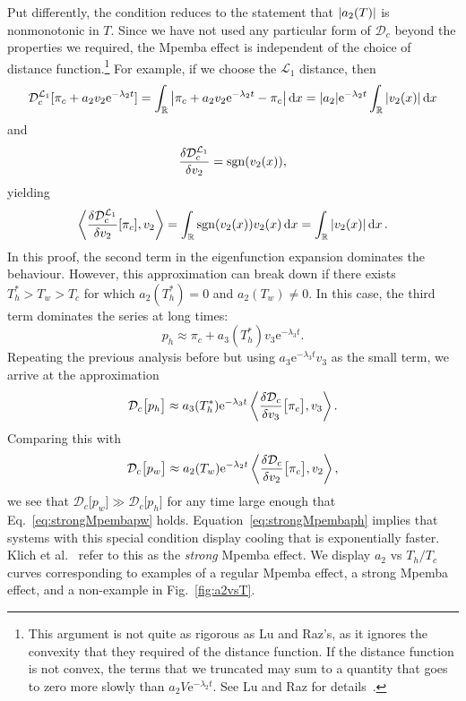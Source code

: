 \documentclass[hyperref={colorlinks=true, urlcolor=blue, citecolor=blue, final, bound}]{sfuthesis}
\newcommand{\sgn}{\mathrm{sgn}}
\newcommand{\e}{\mathrm{e}}
\begin{document}
Put differently, the condition reduces to the statement that $\abs{a_2(T)}$ is nonmonotonic in $T$.  Since we have not used any particular form of $\mathcal D_c$ beyond the properties we required, the Mpemba effect is independent of the choice of distance function.\footnote{This argument is not quite as rigorous as Lu and Raz's, as it ignores the convexity that they required of the distance function. If the distance function is not convex, the terms that we truncated may sum to a quantity that goes to zero more slowly than $a_2V\e^{-\lambda_2t}$. See Lu and Raz for details~\cite[SI]{Lu2017}.} For example, if we choose the $\mathcal L_1$ distance, then
\begin{equation}
    \mathcal D_c^{\mathcal L_1}[\pi_c+a_2v_2\e^{-\lambda_2t}] = \int_{\mathbb R}\abs{\pi_c+a_2v_2\e^{-\lambda_2t}-\pi_c}\dd{x} = \abs{a_2}\e^{-\lambda_2t}\int_{\mathbb R}\abs{v_2(x)}\dd{x}
\end{equation}
and
\begin{equation}
    \fdv{\mathcal D_c^{\mathcal L_1}}{v_2} = \sgn(v_2(x)),
\end{equation}
yielding~\cite{Kumar2020}
\begin{equation}
    \ev{\fdv{\mathcal D_c^{\mathcal L_1}}{v_2}[\pi_c],v_2} = \int_{\mathbb R}\sgn(v_2(x))v_2(x)\dd{x} = \int_{\mathbb R}\abs{v_2(x)}\dd{x}.
\end{equation}
In this proof, the second term in the eigenfunction expansion dominates the behaviour. However, this approximation can break down if there exists $T_h^*>T_w>T_c$ for which $a_2(T_h^*)=0$ and $a_2(T_w)\neq 0$. In this case, the third term dominates the series at long times:
\begin{equation}
    p_h \approx \pi_c + a_3(T_h^*)v_3\e^{-\lambda_3 t}.
\end{equation}
Repeating the previous analysis before but using $a_3\e^{-\lambda_3 t}v_3$ as the small term, we arrive at the approximation
\begin{equation}
    \mathcal D_c\big[p_h\big] \approx a_3(T_h^*)\e^{-\lambda_3 t}\ev{\fdv{\mathcal D_c}{v_3}\big[\pi_c\big],v_3}\label{eq:strongMpembaph}.
\end{equation}
Comparing this with 
\begin{equation}
    \mathcal D_c\big[p_w\big] \approx a_2(T_w)\e^{-\lambda_2 t}\ev{\fdv{\mathcal D_c}{v_2}\big[\pi_c\big], v_2}\label{eq:strongMpembapw},
\end{equation}
we see that $\mathcal D_c\big[p_w\big] \gg \mathcal D_c\big[p_h\big]$ for any time large enough that Eq.~\ref{eq:strongMpembapw} holds. Equation~\ref{eq:strongMpembaph} implies that systems with this special condition display cooling that is exponentially faster. Klich et al.~\cite{Klich2019} refer to this as the \textit{strong} Mpemba effect. We display $a_2$ vs $T_h/T_c$ curves corresponding to examples of a regular Mpemba effect, a strong Mpemba effect, and a non-example in Fig.~\ref{fig:a2vsT}.
\end{document}
